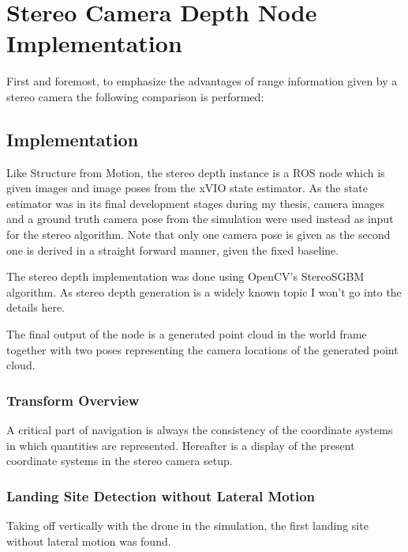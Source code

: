 \chapter{Stereo Camera Depth Node Implementation}
\label{chapter:stereo_camera_depth}

First and foremost, to emphasize the advantages of range information given by a stereo camera the following comparison is performed:

\section{Implementation}

Like Structure from Motion, the stereo depth instance is a ROS node which is given images and image poses from the xVIO state estimator. As the state estimator was in its final development stages during my thesis, camera images and a ground truth camera pose from the simulation were used instead as input for the stereo algorithm. Note that only one camera pose is given as the second one is derived in a straight forward manner, given the fixed baseline.

The stereo depth implementation was done using OpenCV's StereoSGBM algorithm. As stereo depth generation is a widely known topic I won't go into the details here.

The final output of the node is a generated point cloud in the world frame together with two poses representing the camera locations of the generated point cloud.

\subsection{Transform Overview}

A critical part of navigation is always the consistency of the coordinate systems in which quantities are represented. Hereafter is a display of the present coordinate systems in the stereo camera setup.

\subsection{Landing Site Detection without Lateral Motion}

Taking off vertically with the drone in the simulation, the first landing site without lateral motion was found.

